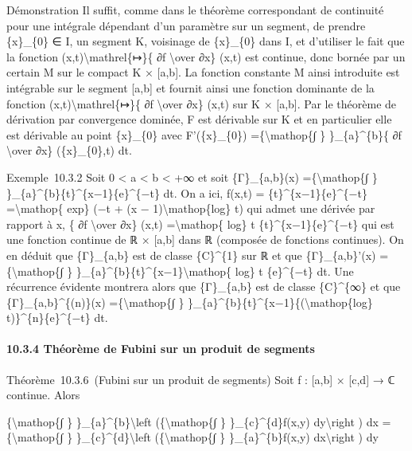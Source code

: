 \documentclass[]{article}
\begin{document}
Démonstration Il suffit, comme dans le théorème correspondant de
continuité pour une intégrale dépendant d'un paramètre sur un segment,
de prendre \{x\}\_\{0\} ∈ I, un segment K, voisinage de \{x\}\_\{0\}
dans I, et d'utiliser le fait que la fonction
(x,t)\textbackslash{}mathrel\{↦\}\{ ∂f \textbackslash{}over ∂x\} (x,t)
est continue, donc bornée par un certain M sur le compact K × {[}a,b{]}.
La fonction constante M ainsi introduite est intégrable sur le segment
{[}a,b{]} et fournit ainsi une fonction dominante de la fonction
(x,t)\textbackslash{}mathrel\{↦\}\{ ∂f \textbackslash{}over ∂x\} (x,t)
sur K × {[}a,b{]}. Par le théorème de dérivation par convergence
dominée, F est dérivable sur K et en particulier elle est dérivable au
point \{x\}\_\{0\} avec F'(\{x\}\_\{0\}) =\{\textbackslash{}mathop\{∫ \}
\}\_\{a\}\^{}\{b\}\{ ∂f \textbackslash{}over ∂x\} (\{x\}\_\{0\},t) dt.

Exemple~10.3.2 Soit 0 \textless{} a \textless{} b \textless{} +∞ et soit
\{Γ\}\_\{a,b\}(x) =\{\textbackslash{}mathop\{∫ \}
\}\_\{a\}\^{}\{b\}\{t\}\^{}\{x−1\}\{e\}\^{}\{−t\} dt. On a ici, f(x,t) =
\{t\}\^{}\{x−1\}\{e\}\^{}\{−t\} =\textbackslash{}mathop\{ exp\} (−t + (x
− 1)\textbackslash{}mathop\{log\} t) qui admet une dérivée par rapport à
x, \{ ∂f \textbackslash{}over ∂x\} (x,t) =\textbackslash{}mathop\{ log\}
t \{t\}\^{}\{x−1\}\{e\}\^{}\{−t\} qui est une fonction continue de ℝ ×
{[}a,b{]} dans ℝ (composée de fonctions continues). On en déduit que
\{Γ\}\_\{a,b\} est de classe \{C\}\^{}\{1\} sur ℝ et que
\{Γ\}\_\{a,b\}'(x) =\{\textbackslash{}mathop\{∫ \}
\}\_\{a\}\^{}\{b\}\{t\}\^{}\{x−1\}\textbackslash{}mathop\{ log\} t
\{e\}\^{}\{−t\} dt. Une récurrence évidente montrera alors que
\{Γ\}\_\{a,b\} est de classe \{C\}\^{}\{∞\} et que
\{Γ\}\_\{a,b\}\^{}\{(n)\}(x) =\{\textbackslash{}mathop\{∫ \}
\}\_\{a\}\^{}\{b\}\{t\}\^{}\{x−1\}\{(\textbackslash{}mathop\{log\}
t)\}\^{}\{n\}\{e\}\^{}\{−t\} dt.

\paragraph{10.3.4 Théorème de Fubini sur un produit de segments}

Théorème~10.3.6~(Fubini sur un produit de segments) Soit f : {[}a,b{]} ×
{[}c,d{]} → ℂ continue. Alors

\{\textbackslash{}mathop\{∫ \} \}\_\{a\}\^{}\{b\}\textbackslash{}left
(\{\textbackslash{}mathop\{∫ \} \}\_\{c\}\^{}\{d\}f(x,y)
dy\textbackslash{}right ) dx =\{\textbackslash{}mathop\{∫ \}
\}\_\{c\}\^{}\{d\}\textbackslash{}left (\{\textbackslash{}mathop\{∫ \}
\}\_\{a\}\^{}\{b\}f(x,y) dx\textbackslash{}right ) dy
\end{document}
